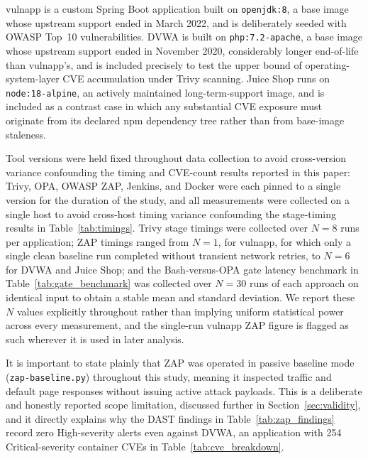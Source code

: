 \documentclass[conference]{IEEEtran}
\begin{document}
vulnapp is a custom Spring Boot application built on \texttt{openjdk:8}, a base image whose upstream support ended in March 2022, and is deliberately seeded with OWASP Top~10 vulnerabilities. DVWA is built on \texttt{php:7.2-apache}, a base image whose upstream support ended in November 2020, considerably longer end-of-life than vulnapp's, and is included precisely to test the upper bound of operating-system-layer CVE accumulation under Trivy scanning. Juice Shop runs on \texttt{node:18-alpine}, an actively maintained long-term-support image, and is included as a contrast case in which any substantial CVE exposure must originate from its declared npm dependency tree rather than from base-image staleness.

Tool versions were held fixed throughout data collection to avoid cross-version variance confounding the timing and CVE-count results reported in this paper: Trivy, OPA, OWASP ZAP, Jenkins, and Docker were each pinned to a single version for the duration of the study, and all measurements were collected on a single host to avoid cross-host timing variance confounding the stage-timing results in Table~\ref{tab:timings}. Trivy stage timings were collected over $N=8$ runs per application; ZAP timings ranged from $N=1$, for vulnapp, for which only a single clean baseline run completed without transient network retries, to $N=6$ for DVWA and Juice Shop; and the Bash-versus-OPA gate latency benchmark in Table~\ref{tab:gate_benchmark} was collected over $N=30$ runs of each approach on identical input to obtain a stable mean and standard deviation. We report these $N$ values explicitly throughout rather than implying uniform statistical power across every measurement, and the single-run vulnapp ZAP figure is flagged as such wherever it is used in later analysis.

It is important to state plainly that ZAP was operated in passive baseline mode (\texttt{zap-baseline.py}) throughout this study, meaning it inspected traffic and default page responses without issuing active attack payloads. This is a deliberate and honestly reported scope limitation, discussed further in Section~\ref{sec:validity}, and it directly explains why the DAST findings in Table~\ref{tab:zap_findings} record zero High-severity alerts even against DVWA, an application with 254 Critical-severity container CVEs in Table~\ref{tab:cve_breakdown}.
\end{document}
